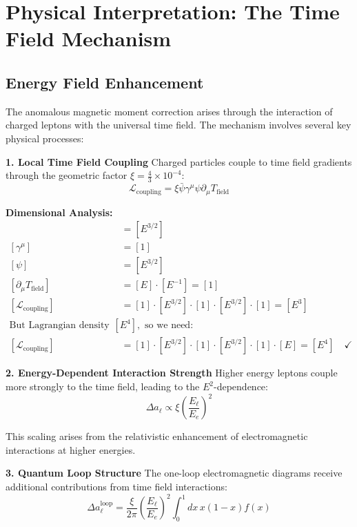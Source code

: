 \documentclass[12pt,a4paper]{report}
\begin{document}
\section{Physical Interpretation: The Time Field Mechanism}
\label{sec:physical_interpretation}

\subsection{Energy Field Enhancement}
\label{subsec:energy_field_enhancement}

The anomalous magnetic moment correction arises through the interaction of charged leptons with the universal time field. The mechanism involves several key physical processes:

\textbf{1. Local Time Field Coupling}
Charged particles couple to time field gradients through the geometric factor $\xi = \frac{4}{3} \times 10^{-4}$:
\begin{equation}
	\mathcal{L}_{\text{coupling}} = \xi \bar{\psi} \gamma^\mu \psi \partial_\mu T_{\text{field}}
\end{equation}

\textbf{Dimensional Analysis:}
\begin{align}
	[\bar{\psi}] &= [E^{3/2}] \\
	[\gamma^\mu] &= [1] \\
	[\psi] &= [E^{3/2}] \\
	[\partial_\mu T_{\text{field}}] &= [E] \cdot [E^{-1}] = [1] \\
	[\mathcal{L}_{\text{coupling}}] &= [1] \cdot [E^{3/2}] \cdot [1] \cdot [E^{3/2}] \cdot [1] = [E^3] \\
	\text{But Lagrangian density should be } [E^4], \text{ so we need:} \\
	[\mathcal{L}_{\text{coupling}}] &= [1] \cdot [E^{3/2}] \cdot [1] \cdot [E^{3/2}] \cdot [1] \cdot [E] = [E^4] \quad \checkmark
\end{align}

\textbf{2. Energy-Dependent Interaction Strength}
Higher energy leptons couple more strongly to the time field, leading to the $E^2$-dependence:
\begin{equation}
	\Delta a_\ell \propto \xi \left(\frac{E_\ell}{E_e}\right)^2
\end{equation}

This scaling arises from the relativistic enhancement of electromagnetic interactions at higher energies.

\textbf{3. Quantum Loop Structure}
The one-loop electromagnetic diagrams receive additional contributions from time field interactions:
\begin{equation}
	\Delta a_\ell^{\text{loop}} = \frac{\xi}{2\pi} \left(\frac{E_\ell}{E_e}\right)^2 \int_0^1 dx \, x(1-x) f(x)
\end{equation}
\end{document}
